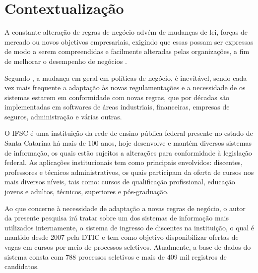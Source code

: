 \section{Contextualização}
\label{contextualizacao}

 A constante alteração de regras de negócio advém de mudanças de lei, forças de mercado ou novos objetivos empresariais, exigindo que essas possam ser expressas de modo a serem compreendidas e facilmente alteradas pelas organizações, a fim de melhorar o desempenho de negócios \cite{flexiblerules}.
 
 Segundo , a mudança em geral em políticas de negócio, é inevitável, sendo cada vez mais frequente a adaptação às novas regulamentações e a necessidade de os sistemas estarem em conformidade com novas regras, que por décadas são implementadas em softwares de áreas industriais, financeiras, empresas de seguros, administração e várias outras.
 
 O \gls{IFSC} é uma instituição da rede de ensino pública federal presente no estado de Santa Catarina há mais de 100 anos, hoje desenvolve e mantém diversos sistemas de informação, os quais estão sujeitos a alterações para conformidade à legislação federal. As aplicações institucionais tem como principais envolvidos: discentes, professores e técnicos administrativos, os quais participam da oferta de cursos nos mais diversos níveis, tais como: cursos de qualificação profissional, educação jovens e adultos, técnicos, superiores e pós-graduação. 
 
 Ao que concerne à necessidade de adaptação a novas regras de negócio, o autor da presente pesquisa irá tratar sobre um dos sistemas de informação mais utilizados internamente, o sistema de ingresso de discentes na instituição, o qual é mantido desde 2007 pela \gls{DTIC} e tem como objetivo disponibilizar ofertas de vagas em cursos por meio de processos seletivos. Atualmente, a base de dados do sistema consta com 788 processos seletivos e mais de 409 mil registros de candidatos.
 

